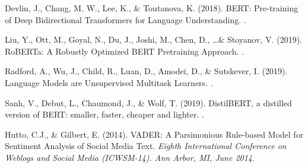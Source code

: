 \documentclass{article}
\begin{document}
\newpage

\begin{thebibliography}{}

    Devlin, J., Chang, M. W., Lee, K., \& Toutanova, K. (2018). \newblock BERT:
    Pre-training of Deep Bidirectional Transformers for Language Understanding.
    .

    Liu, Y., Ott, M., Goyal, N., Du, J., Joshi, M., Chen, D., \ldots \&
    Stoyanov, V. (2019). \newblock RoBERTa: A Robustly Optimized BERT
    Pretraining
    Approach. .

    Radford, A., Wu, J., Child, R., Luan, D., Amodei, D., \& Sutskever, I.
    (2019). \newblock Language Models are Unsupervised Multitask Learners.
    .

    Sanh, V., Debut, L., Chaumond, J., \& Wolf, T. (2019). \newblock
    DistilBERT, a distilled version of BERT: smaller, faster, cheaper and
    lighter.
    .

    Hutto, C.J., \& Gilbert, E. (2014). \newblock VADER: A Parsimonious
    Rule-based Model for Sentiment Analysis of Social Media Text. \newblock
    {\em
        Eighth International Conference on Weblogs and Social Media (ICWSM-14).
        Ann
        Arbor, MI, June 2014}.

\end{thebibliography}

\thispagestyle{empty}
\end{document}
